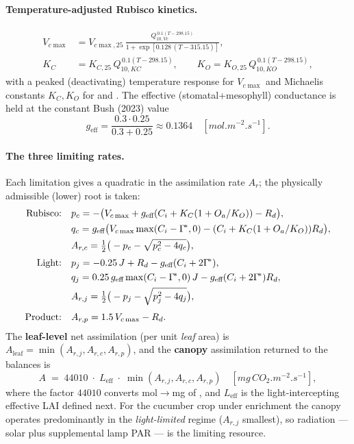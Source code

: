 \documentclass[11pt,a4paper]{article}
\begin{document}
\paragraph{Temperature-adjusted Rubisco kinetics.}
\begin{align}
  V_{c\max} &= V_{c\max,25}\,\frac{Q_{10,Vc}^{\,0.1(T-298.15)}}{1+\exp[0.128\,(T-315.15)]}, \\
  K_C &= K_{C,25}\,Q_{10,KC}^{\,0.1(T-298.15)}, \qquad
  K_O = K_{O,25}\,Q_{10,KO}^{\,0.1(T-298.15)},
\end{align}
with a peaked (deactivating) temperature response for $V_{c\max}$ and Michaelis constants $K_C,K_O$
for  and . The effective (stomatal+mesophyll) conductance is held at the constant
Bush (2023) value
\begin{equation}
  g_{\text{eff}} = \frac{0.3\cdot 0.25}{0.3+0.25} \approx 0.1364 \quad[\si{mol.m^{-2}.s^{-1}}].
\end{equation}
\paragraph{The three limiting rates.} Each limitation gives a quadratic in the assimilation rate
$A_r$; the physically admissible (lower) root is taken:
\begin{align}
  \text{Rubisco:}\quad & p_c = -\big(V_{c\max} + g_{\text{eff}}(C_i + K_C(1+O_a/K_O)) - R_d\big),\notag\\
  & q_c = g_{\text{eff}}\big(V_{c\max}\max(C_i-\Gamma^{\!*},0) - (C_i+K_C(1+O_a/K_O))R_d\big),\notag\\
  & A_{r,c} = \tfrac12\big(-p_c-\sqrt{p_c^2-4q_c}\big),\\[3pt]
  \text{Light:}\quad & p_j = -0.25\,J + R_d - g_{\text{eff}}(C_i+2\Gamma^{\!*}),\notag\\
  & q_j = 0.25\,g_{\text{eff}}\max(C_i-\Gamma^{\!*},0)\,J - g_{\text{eff}}(C_i+2\Gamma^{\!*})R_d,\notag\\
  & A_{r,j} = \tfrac12\big(-p_j-\sqrt{p_j^2-4q_j}\big),\\[3pt]
  \text{Product:}\quad & A_{r,p} = 1.5\,V_{c\max} - R_d.
\end{align}
The \textbf{leaf-level} net assimilation (per unit \emph{leaf} area) is $A_{\text{leaf}} =
\min(A_{r,j},A_{r,c},A_{r,p})$, and the \textbf{canopy} assimilation returned to the balances is
\begin{equation}
  A \;=\; 44010\;\cdot\;L_{\text{eff}}\;\cdot\;\min(A_{r,j},A_{r,c},A_{r,p}) \quad[\si{mg\,CO_2.m^{-2}.s^{-1}}],
  \label{eq:Acanopy}
\end{equation}
where the factor $44010$ converts \si{mol}$\to$\si{mg} of , and $L_{\text{eff}}$ is the
light-intercepting effective LAI defined next. For the cucumber crop under  enrichment the
canopy operates predominantly in the \emph{light-limited} regime ($A_{r,j}$ smallest), so radiation
--- solar plus supplemental lamp PAR --- is the limiting resource.
\end{document}
